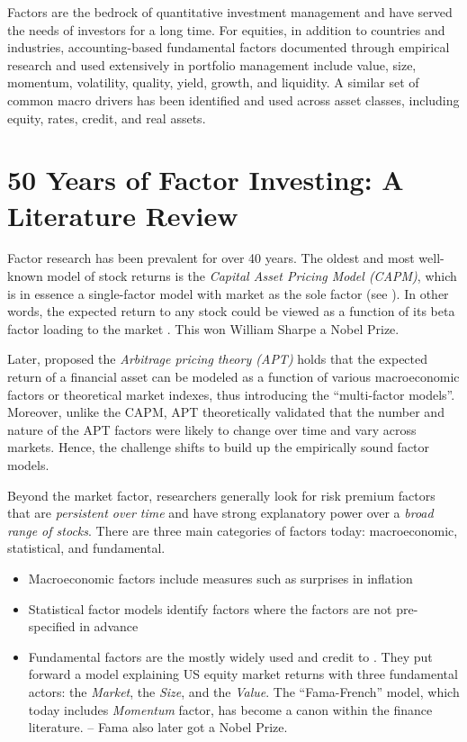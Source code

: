 \documentclass[
]{book}
\begin{document}
Factors are the bedrock of quantitative investment management and have served the needs of investors for a long time. For equities, in addition to countries and industries, accounting-based fundamental factors documented through empirical research and used extensively in portfolio management include value, size, momentum, volatility, quality, yield, growth, and liquidity. A similar set of common macro drivers has been identified and used across asset classes, including equity, rates, credit, and real assets.

\hypertarget{years-of-factor-investing-a-literature-review}{%
\section{50 Years of Factor Investing: A Literature Review}\label{years-of-factor-investing-a-literature-review}}

Factor research has been prevalent for over 40 years. The oldest and most well-known model of stock returns is the {\emph{Capital Asset Pricing Model (CAPM)}}, which is in essence a single-factor model with market as the sole factor (see \citet{sharpe1964capital}). In other words, the expected return to any stock could be viewed as a function of its beta factor loading to the market . This won William Sharpe a Nobel Prize.

Later, \citet{ross1976arbitrage} proposed the {\emph{Arbitrage pricing theory (APT)}} holds that the expected return of a financial asset can be modeled as a function of various macroeconomic factors or theoretical market indexes, thus introducing the ``multi-factor models''. Moreover, unlike the CAPM, APT theoretically validated that the number and nature of the APT factors were likely to change over time and vary across markets. Hence, the challenge shifts to build up the empirically sound factor models.

Beyond the market factor, researchers generally look for risk premium factors that are \emph{persistent over time} and have strong explanatory power over a \emph{broad range of stocks}. There are three main categories of factors today: macroeconomic, statistical, and fundamental.

\begin{itemize}
\item
  Macroeconomic factors include measures such as surprises in inflation \citep{chen1986economic}
\item
  Statistical factor models identify factors where the factors are not pre-specified in advance \citep{chamberlain1983arbitrage}
\item
  Fundamental factors are the mostly widely used and credit to \citet{fama1993common}. They put forward a model explaining US equity market returns with three fundamental actors: the \emph{Market}, the \emph{Size}, and the \emph{Value}. The ``Fama-French'' model, which today includes \citet{carhart1997persistence} \emph{Momentum} factor, has become a canon within the finance literature. -- Fama also later got a Nobel Prize.
\end{itemize}
\end{document}

